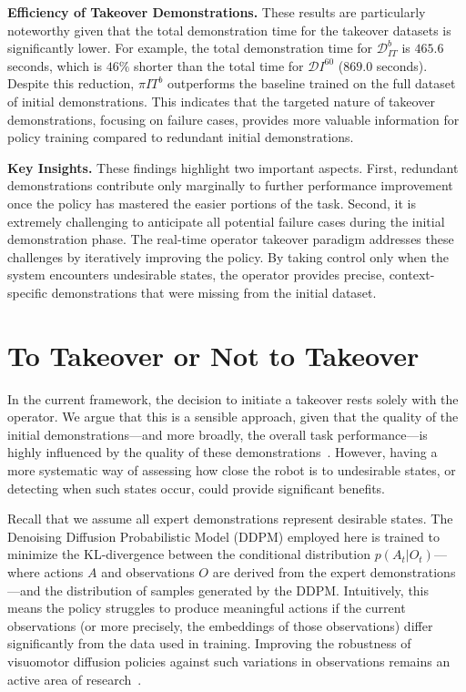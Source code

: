 \textbf{Efficiency of Takeover Demonstrations.}
These results are particularly noteworthy given that the total demonstration time for the takeover datasets is significantly lower. For example, the total demonstration time for $\mathcal{D}_{IT}^b$ is $465.6$ seconds, which is $46\%$ shorter than the total time for $\mathcal{D}I^{60}$ ($869.0$ seconds). Despite this reduction, $\pi{IT}^b$ outperforms the baseline trained on the full dataset of initial demonstrations. This indicates that the targeted nature of takeover demonstrations, focusing on failure cases, provides more valuable information for policy training compared to redundant initial demonstrations.

\textbf{Key Insights.}
These findings highlight two important aspects. First, redundant demonstrations contribute only marginally to further performance improvement once the policy has mastered the easier portions of the task. Second, it is extremely challenging to anticipate all potential failure cases during the initial demonstration phase. The real-time operator takeover paradigm addresses these challenges by iteratively improving the policy. By taking control only when the system encounters undesirable states, the operator provides precise, context-specific demonstrations that were missing from the initial dataset.



\section{To Takeover or Not to Takeover}

In the current framework, the decision to initiate a takeover rests solely with the operator. We argue that this is a sensible approach, given that the quality of the initial demonstrations—and more broadly, the overall task performance—is highly influenced by the quality of these demonstrations~\cite{pari2021surprising}. However, having a more systematic way of assessing how close the robot is to undesirable states, or detecting when such states occur, could provide significant benefits.

Recall that we assume all expert demonstrations represent desirable states. The Denoising Diffusion Probabilistic Model (DDPM) employed here is trained to minimize the KL-divergence between the conditional distribution $p(A_t|O_t)$—where actions $A$ and observations $O$ are derived from the expert demonstrations—and the distribution of samples generated by the DDPM. Intuitively, this means the policy struggles to produce meaningful actions if the current observations (or more precisely, the embeddings of those observations) differ significantly from the data used in training. Improving the robustness of visuomotor diffusion policies against such variations in observations remains an active area of research~\cite{wang2023imitation, zhuang2024enhancing}.

